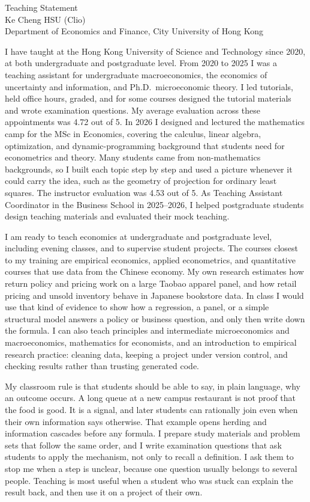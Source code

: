 \documentclass[11pt]{article}
\begin{document}
\begin{center}
{\Large Teaching Statement}\\[0.35em]
Ke Cheng HSU (Clio)\\[0.15em]
{\small Department of Economics and Finance, City University of Hong Kong}
\end{center}

I have taught at the Hong Kong University of Science and Technology since 2020, at both undergraduate and postgraduate level. From 2020 to 2025 I was a teaching assistant for undergraduate macroeconomics, the economics of uncertainty and information, and Ph.D.\ microeconomic theory. I led tutorials, held office hours, graded, and for some courses designed the tutorial materials and wrote examination questions. My average evaluation across these appointments was 4.72 out of 5. In 2026 I designed and lectured the mathematics camp for the MSc in Economics, covering the calculus, linear algebra, optimization, and dynamic-programming background that students need for econometrics and theory. Many students came from non-mathematics backgrounds, so I built each topic step by step and used a picture whenever it could carry the idea, such as the geometry of projection for ordinary least squares. The instructor evaluation was 4.53 out of 5. As Teaching Assistant Coordinator in the Business School in 2025--2026, I helped postgraduate students design teaching materials and evaluated their mock teaching.

I am ready to teach economics at undergraduate and postgraduate level, including evening classes, and to supervise student projects. The courses closest to my training are empirical economics, applied econometrics, and quantitative courses that use data from the Chinese economy. My own research estimates how return policy and pricing work on a large Taobao apparel panel, and how retail pricing and unsold inventory behave in Japanese bookstore data. In class I would use that kind of evidence to show how a regression, a panel, or a simple structural model answers a policy or business question, and only then write down the formula. I can also teach principles and intermediate microeconomics and macroeconomics, mathematics for economists, and an introduction to empirical research practice: cleaning data, keeping a project under version control, and checking results rather than trusting generated code.

My classroom rule is that students should be able to say, in plain language, why an outcome occurs. A long queue at a new campus restaurant is not proof that the food is good. It is a signal, and later students can rationally join even when their own information says otherwise. That example opens herding and information cascades before any formula. I prepare study materials and problem sets that follow the same order, and I write examination questions that ask students to apply the mechanism, not only to recall a definition. I ask them to stop me when a step is unclear, because one question usually belongs to several people. Teaching is most useful when a student who was stuck can explain the result back, and then use it on a project of their own.
\end{document}
